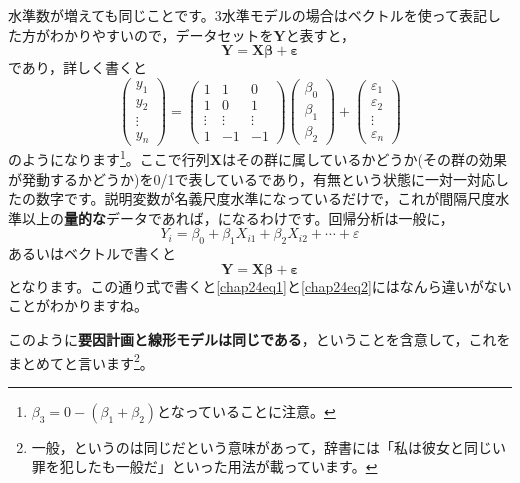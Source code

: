 \documentclass{ltjsbook}
\begin{document}
水準数が増えても同じことです。3水準モデルの場合はベクトルを使って表記した方がわかりやすいので，データセットを$\bm{Y}$と表すと，
\begin{equation}
	\bm{Y}=\bm{X\beta}+\bm{\varepsilon}
	\label{chap24eq1}
\end{equation}
であり，詳しく書くと
\[
	\begin{pmatrix} y_1 \\ y_2 \\ \vdots \\ y_n \end{pmatrix}
	=
	\begin{pmatrix} 1      & 1      & 0      \\
                1      & 0      & 1      \\
                \vdots & \vdots & \vdots \\
                1      & -1     & -1\end{pmatrix}
	\begin{pmatrix} \beta_0 \\ \beta_1 \\ \beta_2 \end{pmatrix}
	+
	\begin{pmatrix} \varepsilon_1 \\ \varepsilon_2 \\ \vdots \\ \varepsilon_n \end{pmatrix}
\]
のようになります\footnote{$\beta_3 = 0 - (\beta_1 + \beta_2)$となっていることに注意。}。ここで行列$\bm{X}$はその群に属しているかどうか(その群の効果が発動するかどうか)を0/1で表しているであり，有無という状態に一対一対応したの数字です。説明変数が名義尺度水準になっているだけで，これが間隔尺度水準以上の\textbf{量的な}データであれば，になるわけです。回帰分析は一般に，
\[ Y_i = \beta_0 + \beta_1 X_{i1} +  \beta_2 X_{i2} + \cdots + \varepsilon \]
あるいはベクトルで書くと
\begin{equation}
	\bm{Y}=\bm{X\beta}+\bm{\varepsilon}
	\label{chap24eq2}
\end{equation}
となります。この通り式で書くと\ref{chap24eq1}と\ref{chap24eq2}にはなんら違いがないことがわかりますね。

このように\textbf{要因計画と線形モデルは同じである}，ということを含意して，これをまとめてと言います\footnote{一般，というのは同じだという意味があって，辞書には「私は彼女と同じい罪を犯したも一般だ」といった用法が載っています。}。
\end{document}
